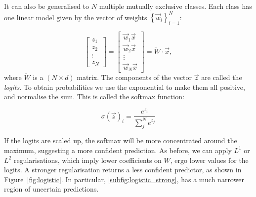 It can also be generalised to $N$ multiple mutually exclusive classes.
Each class has one linear model given by the vector of weights $\left\{\vec w_i \right\}_{i=1} ^N$:

\begin{equation*}
\begin{bmatrix}z_1 \\ z_2 \\ \vdots \\ z_N\end{bmatrix} = 
\begin{bmatrix}
\vec w_1 \vec{x} \\ \vec w_2 \vec{x} \\ \vdots \\ \vec w_N \vec{x}
\end{bmatrix} = 
\widetilde W \cdot \vec{x},
\end{equation*}
where $\widetilde W$ is a $(N \times d)$ matrix.
The components of the vector $\vec{z}$ are called the \emph{logits}. 
To obtain probabilities we use the exponential to make them all positive, and normalise the sum.
This is called the softmax function:

\begin{equation*}
\sigma(\vec{z})_i = \frac{e^{z_i}}{\sum_j^N e^{z_j}}
\end{equation*}

If the logits are scaled up, the softmax will be more concentrated around the maximum, suggesting a more confident prediction.
As before, we can apply $L^1$ or $L^2$ regularisations, which imply lower coefficients on $W$, ergo lower values for the logits.
A stronger regularisation returns a less confident predictor, as shown in Figure~\ref{fig:logistic}.
In particular, \ref{subfig:logistic_strong}, has a much narrower region of uncertain predictions. 

